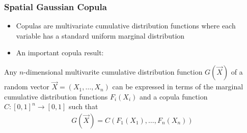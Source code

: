 \documentclass{beamer}
\begin{document}


\begin{frame}
	\frametitle{Spatial Gaussian Copula}
	\begin{itemize}
	\item Copulas are multivariate cumulative distribution functions where each variable has a standard uniform marginal distribution
	\item An important copula result:
	\end{itemize}
	\begin{theorem}[Sklar]
	Any $n$-dimensional multivarite cumulative distribution function $G(\vec{X})$ of a random vector $\vec{X} = (X_1, \ldots ,X_n)$ can be expressed in terms of the marginal cumulative distribution functions $F_i(X_i)$ and a copula function $C: [0,1]^n \rightarrow [0,1]$ such that
		\begin{align*}
			G(\vec{X}) = C(F_1(X_1), \ldots, F_n(X_n))
		\end{align*}
	\end{theorem}
\end{frame}
\end{document}
